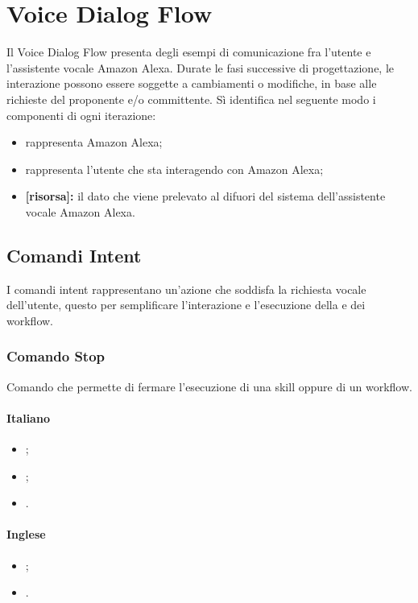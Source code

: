 \section{Voice Dialog Flow}
Il Voice Dialog Flow presenta degli esempi di comunicazione fra l’utente e l’assistente vocale Amazon Alexa. 
Durate le fasi successive di progettazione, le interazione possono essere soggette a cambiamenti o modifiche, in base alle richieste 
del proponente e/o committente. Sì identifica nel seguente modo i componenti di ogni iterazione:

\begin{itemize}
    \item \alexa rappresenta Amazon Alexa;
    \item \utente rappresenta l'utente che sta interagendo con Amazon Alexa;
    \item \textbf{[risorsa]:} il dato che viene prelevato al difuori del sistema dell'assistente vocale Amazon Alexa.
\end{itemize}
\subsection{Comandi Intent}
I comandi intent rappresentano un'azione che soddisfa la richiesta vocale dell'utente, questo per semplificare l'interazione e l'esecuzione
della  e dei workflow.\\

\subsubsection{Comando Stop}
Comando che permette di fermare l'esecuzione di una skill oppure di un workflow.

\paragraph{Italiano}
\begin{itemize}
        \item {};
        \item {};
        \item {}.
\end{itemize}

\paragraph{Inglese}
\begin{itemize}
        \item {};
        \item {}.
\end{itemize}

